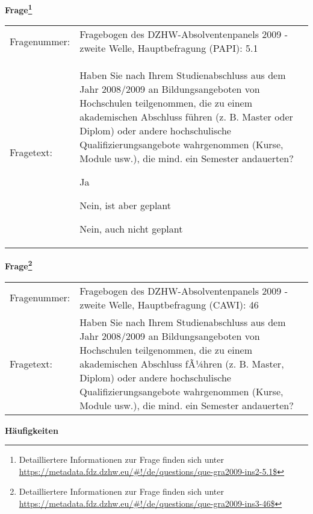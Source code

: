 				\vspace*{0.5cm}
                \noindent\textbf{Frage\footnote{Detailliertere Informationen zur Frage finden sich unter
		              \url{https://metadata.fdz.dzhw.eu/\#!/de/questions/que-gra2009-ins2-5.1$}}}\\
				\begin{tabularx}{\hsize}{@{}lX}
					Fragenummer: &
					  Fragebogen des DZHW-Absolventenpanels 2009 - zweite Welle, Hauptbefragung (PAPI):
					  5.1
 \\
					Fragetext: & Haben Sie nach Ihrem Studienabschluss aus dem Jahr 2008/2009 an Bildungsangeboten von Hochschulen teilgenommen, die zu einem akademischen Abschluss führen (z. B. Master oder Diplom) oder andere hochschulische Qualifizierungsangebote wahrgenommen (Kurse, Module usw.), die mind. ein Semester andauerten?\par  Ja\par  Nein, ist aber geplant\par  Nein, auch nicht geplant \\
				\end{tabularx}
				\vspace*{0.5cm}
                \noindent\textbf{Frage\footnote{Detailliertere Informationen zur Frage finden sich unter
		              \url{https://metadata.fdz.dzhw.eu/\#!/de/questions/que-gra2009-ins3-46$}}}\\
				\begin{tabularx}{\hsize}{@{}lX}
					Fragenummer: &
					  Fragebogen des DZHW-Absolventenpanels 2009 - zweite Welle, Hauptbefragung (CAWI):
					  46
 \\
					Fragetext: & Haben Sie nach Ihrem Studienabschluss aus dem Jahr 2008/2009 an Bildungsangeboten von Hochschulen teilgenommen, die zu einem akademischen Abschluss fÃ¼hren (z. B. Master, Diplom) oder andere hochschulische Qualifizierungsangebote wahrgenommen (Kurse, Module usw.), die mind. ein Semester andauerten? \\
				\end{tabularx}





        		\vspace*{0.5cm}
                \noindent\textbf{Häufigkeiten}


